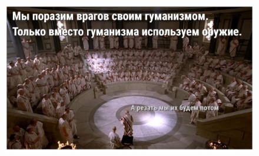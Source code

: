 \begin{figure}[h!tb]
	\centering\includegraphics[scale=0.3]{Scipion/1592402098150092058.png}
\end{figure}
